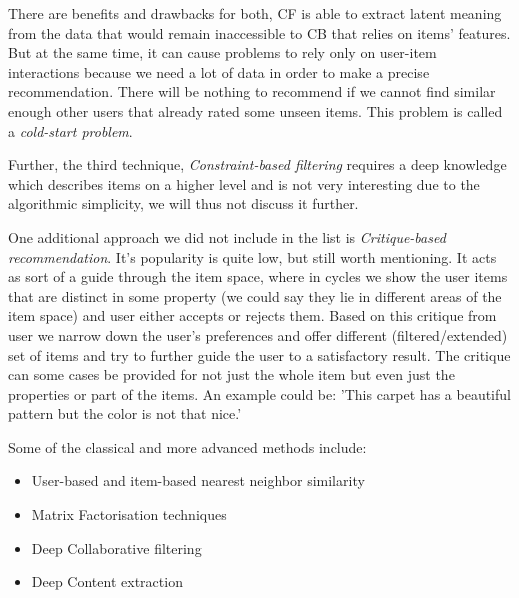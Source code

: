 There are benefits and drawbacks for both, CF is able to extract latent meaning from the data that would remain inaccessible to CB that relies on items' features. But at the same time, it can cause problems to rely only on user-item interactions because we need a lot of data in order to make a precise recommendation. There will be nothing to recommend if we cannot find similar enough other users that already rated some unseen items. This problem is called a \textit{cold-start problem}.

Further, the third technique, \textit{Constraint-based filtering} requires a deep knowledge which describes items on a higher level and is not very interesting due to the algorithmic simplicity, we will thus not discuss it further.

One additional approach we did not include in the list is \textit{Critique-based recommendation}. It's popularity is quite low, but still worth mentioning. It acts as sort of a guide through the item space, where in cycles we show the user items that are distinct in some property (we could say they lie in different areas of the item space) and user either accepts or rejects them. Based on this critique from user we narrow down the user's preferences and offer different (filtered/extended) set of items and try to further guide the user to a satisfactory result. The critique can some cases be provided for not just the whole item but even just the properties or part of the items. An example could be: 'This carpet has a beautiful pattern but the color is not that nice.'
\newline

Some of the classical and more advanced methods include:
\begin{itemize}
    \item User-based and item-based nearest neighbor similarity \cite{hill1995recommending}\cite{shardanand1995social}\cite{balabanovic1997fab}
    \item Matrix Factorisation techniques\cite{koren2009matrix}
    \item Deep Collaborative filtering \cite{he2017neural}\cite{YOUTUBE_deeprec-covington2016}\cite{DeepLearningBasedRecommenderSystem_zhang2019deep}
    \item Deep Content extraction\cite{DeepLearningBasedRecommenderSystem_zhang2019deep}
\end{itemize}



